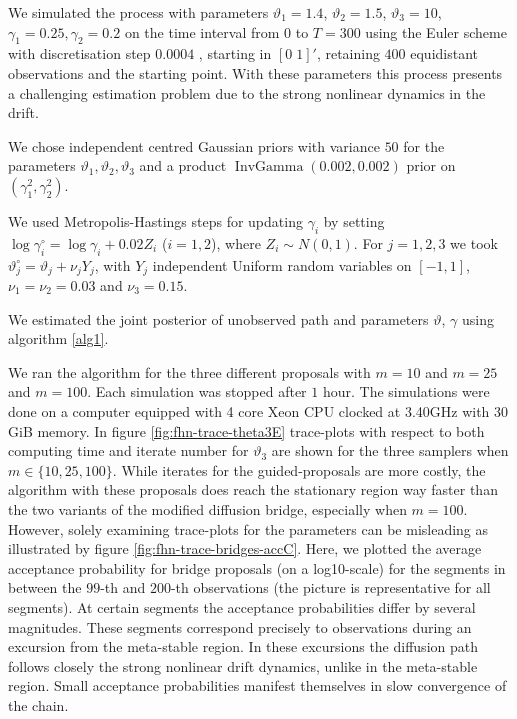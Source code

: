 \documentclass[preprint]{imsart}
\newcommand{\ga}{\gamma}
\theoremstyle{definition}
\begin{document}
We simulated the process with parameters $\vartheta_1 = 1.4$, $\vartheta_2 = 1.5$, $\vartheta_3 = 10$, $\gamma_1= 0.25, \gamma_2 = 0.2$ on the time interval from $0$ to $T=300$ using the Euler scheme with discretisation step $0.0004$ , starting in $[0\; 1]'$, retaining $400$ equidistant observations and the starting point. With these parameters this process presents a challenging estimation problem due to the strong nonlinear dynamics in the drift. 

We chose independent centred Gaussian priors with variance $50$ for the parameters $\vartheta_1, \vartheta_2, \vartheta_3$ and a product  $\operatorname{InvGamma}(0.002,0.002)$ prior on $(\ga^2_1, \ga_2^2)$.


  We used Metropolis-Hastings steps for updating $\ga_i$  by setting $\log \ga_i^\circ=\log \ga_i + 0.02 Z_i$ ($i=1,2$), where $Z_i\sim N(0,1)$. For $j=1,2, 3$ we took $\vartheta_j^\circ=\vartheta_j + \nu_j Y_j$, with $Y_j$ independent Uniform random variables on $[-1,1]$, $\nu_1=\nu_2=0.03$ and $\nu_3=0.15$. 

We estimated the joint posterior of unobserved path and parameters $\vartheta$, $\gamma$ using algorithm \ref{alg1}.
  
We ran the algorithm for the three different proposals with  $m = 10$ and $m = 25$ and $m=100$. Each simulation was stopped after $1$ hour. The simulations were done on a computer equipped with 4 core Xeon CPU clocked at 3.40GHz with 30 GiB memory.
In figure \ref{fig:fhn-trace-theta3E} trace-plots with respect to both computing time and iterate number for $\vartheta_3$ are shown for the three  samplers when $m\in \{10, 25, 100\}$. While iterates for the guided-proposals are more costly, the algorithm with these proposals does reach the stationary region way faster than the two variants of the modified diffusion bridge, especially when $m=100$. However, solely examining trace-plots for the parameters can be misleading as illustrated by figure  \ref{fig:fhn-trace-bridges-accC}. Here, we plotted the average acceptance probability for bridge proposals (on a log10-scale) for the segments in between the $99$-th and $200$-th observations (the picture is representative for all segments). At certain segments the acceptance probabilities differ by several magnitudes.  These segments  correspond precisely to observations  during an excursion from the meta-stable region. In these excursions the diffusion path follows closely the strong nonlinear drift dynamics, unlike in the meta-stable region. Small acceptance probabilities  manifest themselves in slow convergence of the chain.
\end{document}
